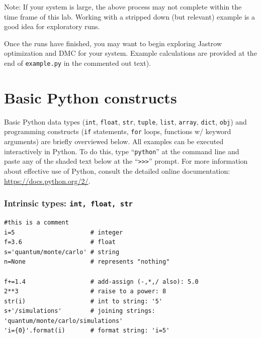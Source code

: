 Note: If your system is large, the above process may not complete within the time frame of this lab.  Working with a stripped down (but relevant) example is a good idea for exploratory runs.

Once the runs have finished, you may want to begin exploring Jastrow optimization and DMC for your system.  Example calculations are provided at the end of \texttt{example.py} in the commented out text).










\appendix

\section{Basic Python constructs\label{app:python_basics}}
Basic Python data types (\texttt{int}, \texttt{float}, \texttt{str}, \texttt{tuple}, \texttt{list}, \texttt{array}, \texttt{dict}, \texttt{obj}) and programming constructs (\texttt{if} statements, \texttt{for} loops, functions w/ keyword arguments) are briefly overviewed below.  All examples can be executed interactively in Python.  To do this, type ``\texttt{python}'' at the command line and paste any of the shaded text below at the ``\texttt{>>>}'' prompt.  For more information about effective use of Python, consult the detailed online documentation: \href{https://docs.python.org/2/}{https://docs.python.org/2/}.

\subsubsection{Intrinsic types: \texttt{int, float, str}}
\begin{shaded}
\begin{verbatim}
#this is a comment
i=5                     # integer
f=3.6                   # float
s='quantum/monte/carlo' # string
n=None                  # represents "nothing"

f+=1.4                  # add-assign (-,*,/ also): 5.0
2**3                    # raise to a power: 8
str(i)                  # int to string: '5'
s+'/simulations'        # joining strings: 'quantum/monte/carlo/simulations'
'i={0}'.format(i)       # format string: 'i=5'

\end{verbatim}
\end{shaded}

